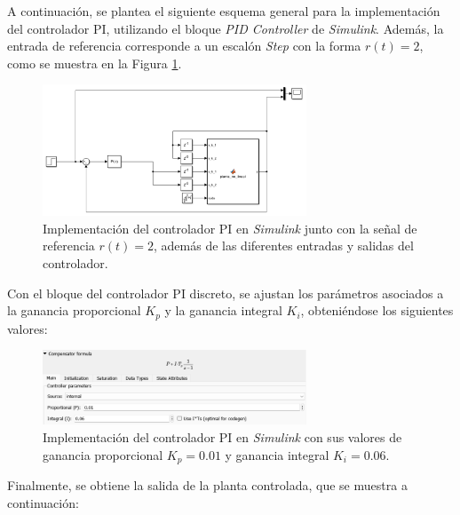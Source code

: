 \begin{enumerate}
    A continuación, se plantea el siguiente esquema general para la implementación del controlador PI, utilizando el bloque \textit{PID Controller} de \textit{Simulink}. Además, la entrada de referencia corresponde a un escalón \textit{Step} con la forma \(r(t) = 2\), como se muestra en la Figura \ref{fig:3}.
    
    \begin{figure}
        \centering
        \includegraphics[width=0.7\textwidth]{img/Figure_3}
        \caption{Implementación del controlador PI en \textit{Simulink} junto con la señal de referencia \(r(t) = 2\), además de las diferentes entradas y salidas del controlador.}
        \label{fig:3}
    \end{figure}
    
    Con el bloque del controlador PI discreto, se ajustan los parámetros asociados a la ganancia proporcional \(K_p\) y la ganancia integral \(K_i\), obteniéndose los siguientes valores:
    
    \begin{figure}
        \centering
        \includegraphics[width=0.7\textwidth]{img/Figure_5}
        \caption{Implementación del controlador PI en \textit{Simulink} con sus valores de ganancia proporcional \(K_{p} = 0.01\) y ganancia integral \(K_{i} = 0.06\).}
        \label{fig:4}
    \end{figure}
    
    Finalmente, se obtiene la salida de la planta controlada, que se muestra a continuación:
    

\end{enumerate}
